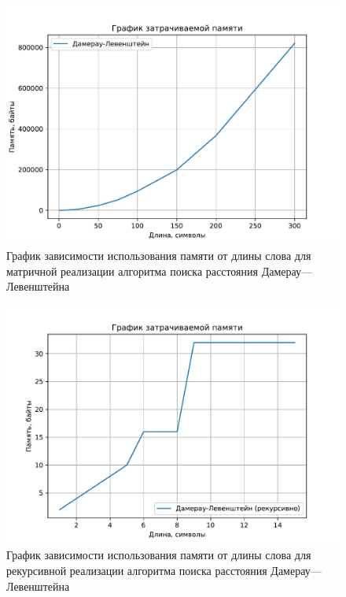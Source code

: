 \begin{figure}[H]
	\centering
	\includegraphics{assets/plots/mem-dam-lev.pdf}
	\caption{График зависимости использования памяти от длины слова для матричной реализации алгоритма поиска расстояния Дамерау---Левенштейна}
	\label{plt:mem-dam-lev}
\end{figure}

\begin{figure}[H]
	\centering
	\includegraphics{assets/plots/mem-rec.pdf}
	\caption{График зависимости использования памяти от длины слова для рекурсивной реализации алгоритма поиска расстояния Дамерау---Левенштейна}
	\label{plt:mem-rec}
\end{figure}

